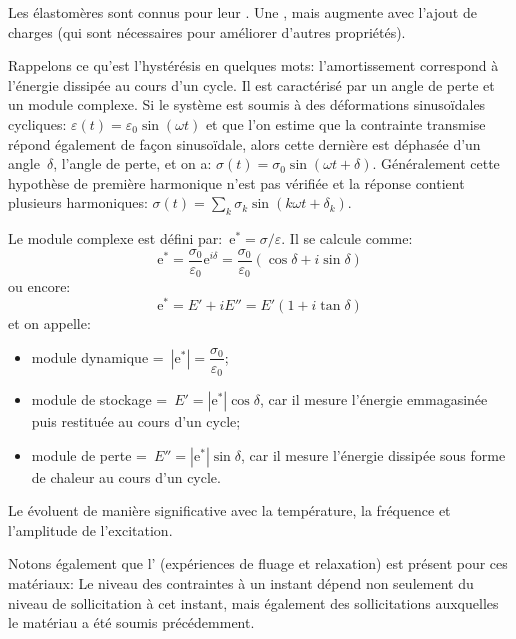 \medskip
Les élastomères sont connus pour leur .
Une , mais augmente avec l'ajout de charges
(qui sont nécessaires pour améliorer d'autres propriétés).

Rappelons ce qu'est l'hystérésis en quelques mots:
l'amortissement correspond à l'énergie dissipée au cours d'un cycle. Il est
caractérisé par un angle de perte et un module complexe.
Si le système est soumis à des déformations sinusoïdales cycliques:
$\varepsilon(t)=\varepsilon_0\sin(\omega t)$ et que l'on estime que la
contrainte transmise répond également de façon sinusoïdale, alors cette
dernière est déphasée d'un angle~$\delta$, l'angle de perte, et on a:
$\sigma(t)=\sigma_0\sin(\omega t+\delta)$.
Généralement cette hypothèse de première harmonique n'est pas
vérifiée et la réponse contient plusieurs harmoniques:
$\sigma(t) = \sum_k \sigma_k\sin(k\omega t+\delta_k)$.

Le module complexe est défini par:~$\mathrm{e}^* = \sigma / \varepsilon$. Il se calcule comme:
\begin{equation} \mathrm{e}^*=\dfrac{\sigma_0}{\varepsilon_0}\mathrm{e}^{i\delta}=\dfrac{\sigma_0}{\varepsilon_0}(\cos\delta+i\sin\delta)\end{equation}
ou encore:
\begin{equation}
\mathrm{e}^* = E' + i E'' = E'(1+i\tan\delta)
\end{equation}
et on appelle:
\begin{itemize}
	\item module dynamique =~$|\mathrm{e}^*|=\dfrac{\sigma_0}{\varepsilon_0}$;
	\item module de stockage =~$E'=|\mathrm{e}^*|\cos\delta$, car il mesure l'énergie
		emmagasinée puis restituée au cours d'un cycle;
	\item module de perte =~$E''=|\mathrm{e}^*|\sin\delta$, car il mesure l'énergie
		dissipée sous forme de chaleur au cours d'un cycle.
\end{itemize}
Le 
évoluent de manière significative avec la température, la fréquence et l'amplitude
de l'excitation.

\medskip
Notons également que l' (expériences de fluage et relaxation) est présent
pour ces matériaux:
Le niveau des contraintes à un instant dépend non seulement du niveau de sollicitation
à cet instant, mais également des sollicitations auxquelles le matériau a été soumis
précédemment.


